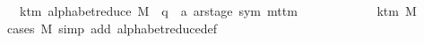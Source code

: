 \begin{isabellebody}
\ \ \ {\isachardoublequoteopen}k{\isacharunderscore}{\kern0pt}tm\ {\isacharparenleft}{\kern0pt}alphabet{\isacharunderscore}{\kern0pt}reduce\ M\ {\isacharcolon}{\kern0pt}{\isacharcolon}{\kern0pt}\ {\isacharparenleft}{\kern0pt}{\isacharprime}{\kern0pt}q\ {\isasymtimes}\ {\isacharprime}{\kern0pt}a\ ar{\isacharunderscore}{\kern0pt}stage{\isacharcomma}{\kern0pt}\ sym{}{\isacharparenright}{\kern0pt}\ mttm{\isacharparenright}{\kern0pt}\isanewline
\ \ \ \ \ \ \ \ \ \ \ {\isacharequal}{\kern0pt}\ k{\isacharunderscore}{\kern0pt}tm\ M{\isachardoublequoteclose}\isanewline
%
\isadelimproof
\ \ %
\endisadelimproof
%
\isatagproof
{}\isamarkupfalse%
\ {\isacharparenleft}{\kern0pt}cases\ M{\isacharparenright}{\kern0pt}\ {\isacharparenleft}{\kern0pt}simp\ add{\isacharcolon}{\kern0pt}\ alphabet{\isacharunderscore}{\kern0pt}reduce{\isacharunderscore}{\kern0pt}def{\isacharparenright}{\kern0pt}%
\endisatagproof
{\isafoldproof}%
%
\isadelimproof
\isanewline
%
\endisadelimproof
%
\isadelimtheory
\isanewline
%
\endisadelimtheory
%
\isatagtheory
{}\isamarkupfalse%
%
\endisatagtheory
{\isafoldtheory}%
%
\isadelimtheory
%
\endisadelimtheory
%
\end{isabellebody}%
\endinput
